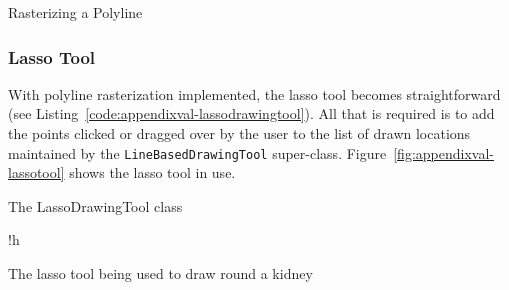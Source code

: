 \begin{stulisting}[p]
\caption{Rasterizing a Polyline}
\label{code:appendixval-rasterizepolyline}

\end{stulisting}

\subsubsection{Lasso Tool}

With polyline rasterization implemented, the lasso tool becomes straightforward (see Listing~\ref{code:appendixval-lassodrawingtool}). All that is required is to add the points clicked or dragged over by the user to the list of drawn locations maintained by the \texttt{LineBasedDrawingTool} super-class. Figure~\ref{fig:appendixval-lassotool} shows the lasso tool in use.

\begin{stulisting}[!h]
\caption{The LassoDrawingTool class}
\label{code:appendixval-lassodrawingtool}

\end{stulisting}

\begin{stusubfig}{!h}
	\hspace{4mm}%
\caption{The lasso tool being used to draw round a kidney}
\label{fig:appendixval-lassotool}
\end{stusubfig}

